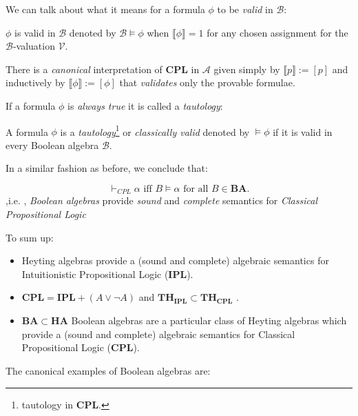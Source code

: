 		We can talk about what it means for a formula $\phi$ to be \emph{valid} in $ \mathcal{B} $:
		
		\begin{definition}[validity in BA]
			$\phi$ is valid in $\mathcal{B}$ denoted by $\mathcal{B} \models \phi$ when $\llbracket \phi \rrbracket = 1$ for any chosen assignment for the $\mathcal{B}$-valuation $\mathcal{V}$.
		\end{definition}
	There is a \emph{canonical} interpretation of \textbf{CPL} in $\mathcal{A}$ given simply by $\llbracket p \rrbracket := [p]$ and inductively by $\llbracket \phi \rrbracket := [\phi]$ that \emph{validates} only the provable formulae.
		
		If a formula $\phi$ is \emph{always true} it is called a \emph{tautology}:
		
		\begin{definition}
			A formula $\phi$ is a \emph{tautology}\footnote{tautology in \textbf{CPL}.} or \emph{classically valid} denoted by $\vDash \phi$ if it is valid in every Boolean algebra $\mathcal{B}$.
		\end{definition}	
				
In a similar fashion as before, we conclude that:
		
		\begin{prop}
			\begin{equation*}
				\vdash_{CPL} \alpha \text{ iff } B \vDash \alpha \text{ for all } B \in \mathbf{BA}.
			\end{equation*}		,i.e. ,
			\emph{Boolean algebras} provide \emph{sound} and \emph{complete} semantics for \emph{Classical Propositional Logic}
		\end{prop}
		
		
		To sum up:
		\begin{itemize}
			\item Heyting algebras provide a (sound and complete) algebraic semantics for Intuitionistic Propositional Logic (\textbf{IPL}).
			\item 	$\textbf{CPL} = \textbf{IPL} + (A \lor \neg A)$ and 	$\textbf{TH}_\textbf{IPL} \subset \textbf{TH}_\textbf{CPL}$ . 
			\item $\mathbf{BA} \subset \mathbf{HA}$ Boolean algebras are a particular class of Heyting algebras  which provide a (sound and complete) algebraic semantics for Classical Propositional Logic (\textbf{CPL}).
		\end{itemize} 
	
	
			The canonical examples of Boolean algebras are:
			
